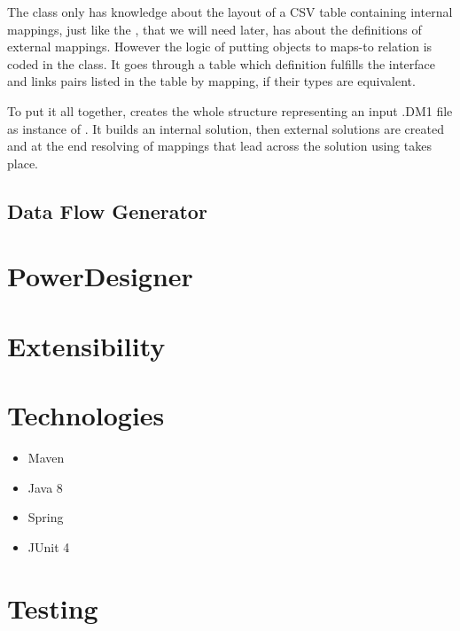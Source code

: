 The   class only has knowledge about the layout of a CSV table containing internal mappings, just like the , that we will need later, has about the definitions of external mappings. However the logic of putting objects to maps-to relation is coded in the  class.
It goes through a table which definition fulfills the interface  and links pairs listed in the table by mapping, if their types are equivalent.



To put it all together,  creates the whole structure representing an input .DM1 file as instance of . It builds an internal solution, then external solutions are created and at the end resolving of mappings that lead across the solution using  takes place.

\subsection{Data Flow Generator}

\section{PowerDesigner}

\section{Extensibility}



\section{Technologies}

\begin{itemize}
	\item Maven
	\item Java 8
	\item Spring
	\item JUnit 4
\end{itemize}

\section{Testing}